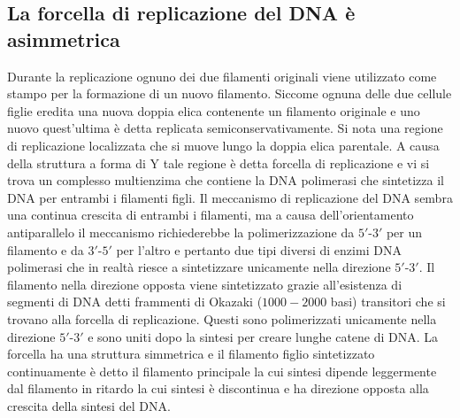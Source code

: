\subsection{La forcella di replicazione del DNA \`e asimmetrica}
Durante la replicazione ognuno dei due filamenti originali viene utilizzato come stampo per la formazione di un nuovo filamento. Siccome ognuna delle due cellule figlie eredita una nuova
doppia elica contenente un filamento originale e uno nuovo quest'ultima \`e detta replicata semiconservativamente. Si nota una regione di replicazione localizzata che si muove lungo
la doppia elica parentale. A causa della struttura a forma di Y tale regione \`e detta forcella di replicazione e vi si trova un complesso multienzima che contiene la DNA polimerasi che
sintetizza il DNA per entrambi i filamenti figli. Il meccanismo di replicazione del DNA sembra una continua crescita di entrambi i filamenti, ma a causa dell'orientamento antiparallelo
il meccanismo richiederebbe la polimerizzazione da $5'$-$3'$ per un filamento e da $3'$-$5'$ per l'altro e pertanto due tipi diversi di enzimi DNA polimerasi che in realt\`a riesce a 
sintetizzare unicamente nella direzione $5'$-$3'$. Il filamento nella direzione opposta viene sintetizzato grazie all'esistenza di segmenti di DNA detti frammenti di Okazaki ($1000-2000$
basi) transitori che si trovano alla forcella di replicazione. Questi sono polimerizzati unicamente nella direzione $5'$-$3'$ e sono uniti dopo la sintesi per creare lunghe catene di 
DNA. La forcella ha una struttura simmetrica e il filamento figlio sintetizzato continuamente \`e detto il filamento principale la cui sintesi dipende leggermente dal filamento in ritardo
la cui sintesi \`e discontinua e ha direzione opposta alla crescita della sintesi del DNA.

